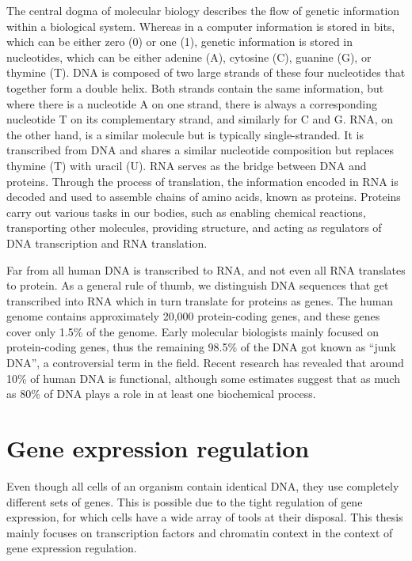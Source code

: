 The central dogma of molecular biology describes the flow of genetic information within a biological system. Whereas in a computer information is stored in bits, which can be either zero (0) or one (1), genetic information is stored in nucleotides, which can be either adenine (A), cytosine (C), guanine (G), or thymine (T). DNA is composed of two large strands of these four nucleotides that together form a double helix. Both strands contain the same information, but where there is a nucleotide A on one strand, there is always a corresponding nucleotide T on its complementary strand, and similarly for C and G. RNA, on the other hand, is a similar molecule but is typically single-stranded. It is transcribed from DNA and shares a similar nucleotide composition but replaces thymine (T) with uracil (U). RNA serves as the bridge between DNA and proteins. Through the process of translation, the information encoded in RNA is decoded and used to assemble chains of amino acids, known as proteins. Proteins carry out various tasks in our bodies, such as enabling chemical reactions, transporting other molecules, providing structure, and acting as regulators of DNA transcription and RNA translation.

Far from all human DNA is transcribed to RNA, and not even all RNA translates to protein. As a general rule of thumb, we distinguish DNA sequences that get transcribed into RNA which in turn translate for proteins as genes. The human genome contains approximately 20,000 protein-coding genes, and these genes cover only 1.5\% of the genome\cite{Piovesan2019}. Early molecular biologists mainly focused on protein-coding genes, thus the remaining 98.5\% of the DNA got known as ``junk DNA'', a controversial term in the field\cite{Graur2013}. Recent research has revealed that around 10\% of human DNA is functional\cite{Graur2013}, although some estimates suggest that as much as 80\% of DNA plays a role in at least one biochemical process\cite{encode2012}.

\section{Gene expression regulation}

Even though all cells of an organism contain identical DNA, they use completely different sets of genes. This is possible due to the tight regulation of gene expression, for which cells have a wide array of tools at their disposal. This thesis mainly focuses on transcription factors and chromatin context in the context of gene expression regulation.

